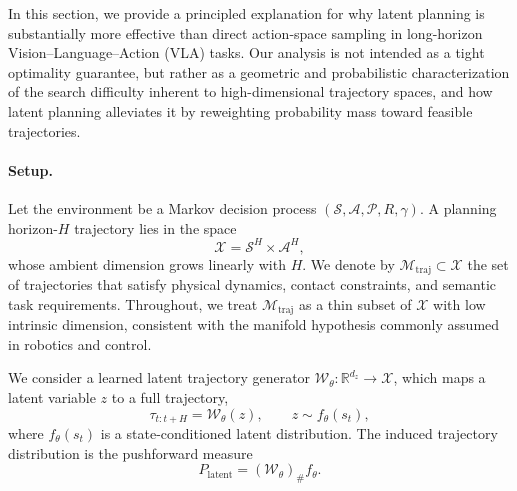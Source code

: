 
\label{appendix:latent_planning}

In this section, we provide a principled explanation for why latent planning 
is substantially more effective than direct action-space sampling in long-horizon
Vision--Language--Action (VLA) tasks.
Our analysis is not intended as a tight optimality guarantee,
but rather as a geometric and probabilistic characterization of the search difficulty
inherent to high-dimensional trajectory spaces, and how latent planning alleviates it
by reweighting probability mass toward feasible trajectories.

\paragraph{Setup.}
Let the environment be a Markov decision process
$(\mathcal{S}, \mathcal{A}, \mathcal{P}, R, \gamma)$.
A planning horizon-$H$ trajectory lies in the space
\[
\mathcal{X} = \mathcal{S}^H \times \mathcal{A}^H,
\]
whose ambient dimension grows linearly with $H$.
We denote by $\mathcal{M}_{\mathrm{traj}} \subset \mathcal{X}$
the set of trajectories that satisfy physical dynamics, contact constraints,
and semantic task requirements.
Throughout, we treat $\mathcal{M}_{\mathrm{traj}}$ as a thin subset of $\mathcal{X}$
with low intrinsic dimension, consistent with the manifold hypothesis
commonly assumed in robotics and control.

We consider a learned latent trajectory generator
$\mathcal{W}_\theta : \mathbb{R}^{d_z} \rightarrow \mathcal{X}$,
which maps a latent variable $z$ to a full trajectory,
\[
\tau_{t:t+H} = \mathcal{W}_\theta(z), \qquad z \sim f_\theta(s_t),
\]
where $f_\theta(s_t)$ is a state-conditioned latent distribution.
The induced trajectory distribution is the pushforward measure
\[
P_{\mathrm{latent}} = (\mathcal{W}_\theta)_\# f_\theta .
\]

